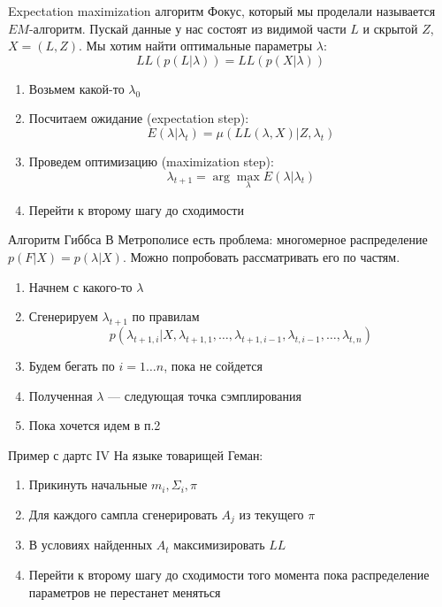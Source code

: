 \documentclass[14pt, fleqn, xcolor={dvipsnames, table}]{beamer}
\begin{document}
\begin{frame}{Expectation maximization алгоритм}
\small
Фокус, который мы проделали называется $EM$-алгоритм. Пускай данные у нас состоят из видимой части $L$ и скрытой $Z$, $X = (L,Z)$. Мы хотим найти оптимальные параметры $\lambda$:
$$
LL(p(L|\lambda)) = LL(p(X|\lambda))
$$
\begin{enumerate}
  \item Возьмем какой-то $\lambda_0$
  \item Посчитаем ожидание (expectation step):
  $$
  E(\lambda | \lambda_t) = \mu\left(LL(\lambda,X) | Z,\lambda_t \right)
  $$
  \item Проведем оптимизацию (maximization step):
  $$
  \lambda_{t+1} = \arg \max_{\lambda} E(\lambda | \lambda_t)
  $$
  \item Перейти к второму шагу до сходимости
\end{enumerate}
\end{frame}

\begin{frame}{Алгоритм Гиббса}
В Метрополисе есть проблема: многомерное распределение $p(F|X) = p(\lambda|X)$. Можно попробовать рассматривать его по частям.
\begin{enumerate}
  \item Начнем с какого-то $\lambda$
  \item Сгенерируем $\lambda_{t+1}$ по правилам
$$
p(\lambda_{t + 1,i} | X, \lambda_{t+1,1},\ldots,\lambda_{t+1, i-1}, \lambda_{t, i-1},\ldots, \lambda_{t,n})
$$
  \item Будем бегать по $i=1\ldots n$, пока не сойдется
  \item Полученная $\lambda$ --- следующая точка сэмплирования
  \item Пока хочется идем в п.2
\end{enumerate}
\end{frame}

\begin{frame}{Пример с дартс IV}
\small
На языке товарищей Геман:
\begin{enumerate}
  \item Прикинуть начальные $m_i, \Sigma_i, \pi$
  \item Для каждого сампла сгенерировать $A_j$ из текущего $\pi$
  \item В условиях найденных $A_t$ максимизировать $LL$
  \item Перейти к второму шагу до сходимости того момента пока распределение параметров не перестанет меняться
\end{enumerate}
\end{frame}
\end{document}
